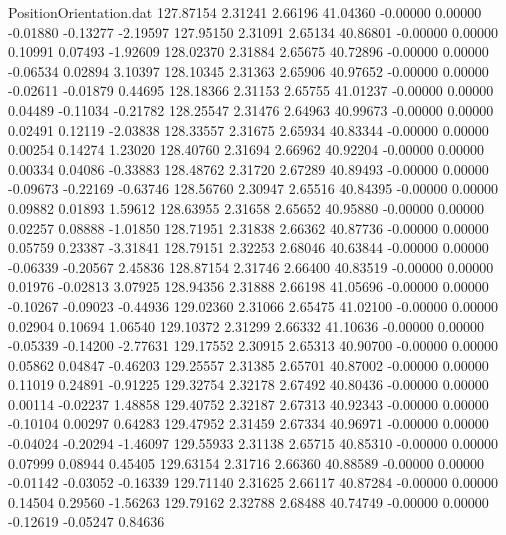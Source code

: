\begin{filecontents}{PositionOrientation.dat}
 127.87154    2.31241    2.66196    41.04360   -0.00000    0.00000   -0.01880   -0.13277   -2.19597
 127.95150    2.31091    2.65134    40.86801   -0.00000    0.00000    0.10991    0.07493   -1.92609
 128.02370    2.31884    2.65675    40.72896   -0.00000    0.00000   -0.06534    0.02894    3.10397
 128.10345    2.31363    2.65906    40.97652   -0.00000    0.00000   -0.02611   -0.01879    0.44695
 128.18366    2.31153    2.65755    41.01237   -0.00000    0.00000    0.04489   -0.11034   -0.21782
 128.25547    2.31476    2.64963    40.99673   -0.00000    0.00000    0.02491    0.12119   -2.03838
 128.33557    2.31675    2.65934    40.83344   -0.00000    0.00000    0.00254    0.14274    1.23020
 128.40760    2.31694    2.66962    40.92204   -0.00000    0.00000    0.00334    0.04086   -0.33883
 128.48762    2.31720    2.67289    40.89493   -0.00000    0.00000   -0.09673   -0.22169   -0.63746
 128.56760    2.30947    2.65516    40.84395   -0.00000    0.00000    0.09882    0.01893    1.59612
 128.63955    2.31658    2.65652    40.95880   -0.00000    0.00000    0.02257    0.08888   -1.01850
 128.71951    2.31838    2.66362    40.87736   -0.00000    0.00000    0.05759    0.23387   -3.31841
 128.79151    2.32253    2.68046    40.63844   -0.00000    0.00000   -0.06339   -0.20567    2.45836
 128.87154    2.31746    2.66400    40.83519   -0.00000    0.00000    0.01976   -0.02813    3.07925
 128.94356    2.31888    2.66198    41.05696   -0.00000    0.00000   -0.10267   -0.09023   -0.44936
 129.02360    2.31066    2.65475    41.02100   -0.00000    0.00000    0.02904    0.10694    1.06540
 129.10372    2.31299    2.66332    41.10636   -0.00000    0.00000   -0.05339   -0.14200   -2.77631
 129.17552    2.30915    2.65313    40.90700   -0.00000    0.00000    0.05862    0.04847   -0.46203
 129.25557    2.31385    2.65701    40.87002   -0.00000    0.00000    0.11019    0.24891   -0.91225
 129.32754    2.32178    2.67492    40.80436   -0.00000    0.00000    0.00114   -0.02237    1.48858
 129.40752    2.32187    2.67313    40.92343   -0.00000    0.00000   -0.10104    0.00297    0.64283
 129.47952    2.31459    2.67334    40.96971   -0.00000    0.00000   -0.04024   -0.20294   -1.46097
 129.55933    2.31138    2.65715    40.85310   -0.00000    0.00000    0.07999    0.08944    0.45405
 129.63154    2.31716    2.66360    40.88589   -0.00000    0.00000   -0.01142   -0.03052   -0.16339
 129.71140    2.31625    2.66117    40.87284   -0.00000    0.00000    0.14504    0.29560   -1.56263
 129.79162    2.32788    2.68488    40.74749   -0.00000    0.00000   -0.12619   -0.05247    0.84636

\end{filecontents}
